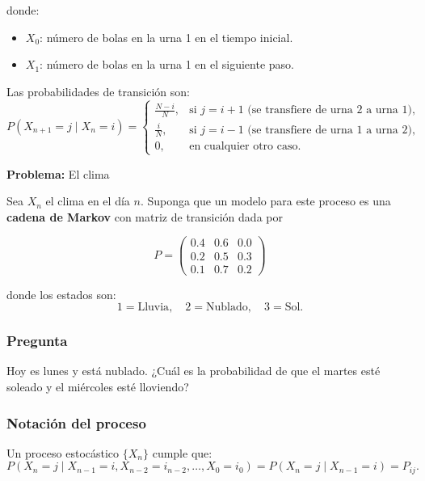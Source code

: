 \documentclass[12pt,a4paper]{article}
\begin{document}
donde:
\begin{itemize}
    \item $X_0$: número de bolas en la urna 1 en el tiempo inicial.
    \item $X_1$: número de bolas en la urna 1 en el siguiente paso.
\end{itemize}

Las probabilidades de transición son:
\begin{equation*}
P(X_{n+1} = j \mid X_n = i) =
\begin{cases}
\frac{N-i}{N}, & \text{si } j = i+1 \text{ (se transfiere de urna 2 a urna 1)},\\
\frac{i}{N}, & \text{si } j = i-1 \text{ (se transfiere de urna 1 a urna 2)},\\
0, & \text{en cualquier otro caso}.
\end{cases}
\end{equation*}

\textbf{Problema:} El clima

Sea $X_n$ el clima en el día $n$. Suponga que un modelo para este proceso es una 
\textbf{cadena de Markov} con matriz de transición dada por

\begin{equation*}
P =
\begin{pmatrix}
0.4 & 0.6 & 0.0 \\
0.2 & 0.5 & 0.3 \\
0.1 & 0.7 & 0.2
\end{pmatrix}
\end{equation*}

donde los estados son:
\begin{equation*}
1 = \text{Lluvia}, \quad
2 = \text{Nublado}, \quad
3 = \text{Sol}.
\end{equation*}

\subsubsection*{Pregunta}
Hoy es lunes y está nublado. ¿Cuál es la probabilidad de que el martes esté soleado 
y el miércoles esté lloviendo?

\subsubsection*{Notación del proceso}
Un proceso estocástico $\{X_n\}$ cumple que:
\begin{equation*}
P(X_n = j \mid X_{n-1} = i, X_{n-2} = i_{n-2}, \ldots, X_0 = i_0) 
= P(X_n = j \mid X_{n-1} = i) = P_{ij}.
\end{equation*}
\end{document}
